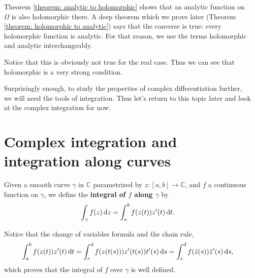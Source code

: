 \documentclass{chapter}
\begin{document}
            \bigskip
            Theorem \ref{theorem: analytic to holomorphic} shows that an analytic function on $\Omega$ is also holomorphic there. A deep theorem which we prove later (Theorem \ref{theorem: holomorphic to analytic}) says that the converse is true: every holomorphic function is analytic. For that reason, we use the terms holomorphic and analytic interchangeably.

            \begin{remark}
                Notice that this is obviously not true for the real case. Thus we can see that holomorphic is a very strong condition.
            \end{remark}

            \bigskip
            Surprisingly enough, to study the properties of complex differentiation further, we will need the tools of integration. Thus let's return to this topic later and look at the complex integration for now.

        \section{Complex integration and integration along curves}

            \begin{definition}
                Given a smooth curve $\gamma$ in $\mathbb{C}$ parametrized by $z :[a, b] \to \mathbb{C}$, and $f$ a continuous function on $\gamma$, we define the \textbf{integral of $f$ along $\gamma$} by \[\int_{\gamma} f(z) \mathop{}\!\mathrm{d} z=\int_{a}^{b} f(z(t)) z^{\prime}(t) \mathop{}\!\mathrm{d} t.\]
            \end{definition}

            \begin{remark}
                Notice that the change of variables formula and the chain rule, \[\int_{a}^{b} f(z(t)) z^{\prime}(t) \mathop{}\!\mathrm{d} t=\int_{c}^{d} f(z(t(s))) z^{\prime}(t(s)) t^{\prime}(s) \mathop{}\!\mathrm{d} s=\int_{c}^{d} f(\tilde{z}(s)) \tilde{z}^{\prime}(s) \mathop{}\!\mathrm{d} s,\] which proves that the integral of $f$ over $\gamma$ is well defined.
            \end{remark}
\end{document}
